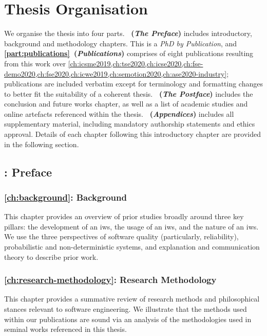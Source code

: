 \section{Thesis Organisation}
\label{sec:introduction:organisation}

We organise the thesis into four parts. \textbf{~(\textit{The Preface})} includes introductory, background and methodology chapters. This is a \textit{PhD by Publication}, and \textbf{\cref{part:publications}~(\textit{Publications})} comprises of eight publications resulting from this work over \cref{ch:icsme2019,ch:tse2020,ch:icse2020,ch:fse-demo2020,ch:fse2020,ch:icwe2019,ch:semotion2020,ch:ase2020-industry}; publications are included verbatim except for terminology and formatting changes to better fit the suitability of a coherent thesis. \textbf{~(\textit{The Postface})} includes the conclusion and future works chapter, as well as a list of academic studies and online artefacts referenced within the thesis. \textbf{~(\textit{Appendices})} includes all supplementary material, including mandatory authorship statements and ethics approval. Details of each chapter following this introductory chapter are provided in the following section.

\subsection{: Preface}

\subsubsection{\cref{ch:background}: Background} This chapter provides an overview of prior studies broadly around three key pillars: the development of an \gls{iws}, the usage of an \gls{iws}, and the nature of an \gls{iws}. We use the three perspectives of software quality (particularly, reliability), probabilistic and non-deterministic systems, and explanation and communication theory to describe prior work.

\subsubsection{\cref{ch:research-methodology}: Research Methodology} This chapter provides a summative review of research methods and philosophical stances relevant to software engineering. We illustrate that the methods used within our publications are sound via an analysis of the methodologies used in seminal works referenced in this thesis.

